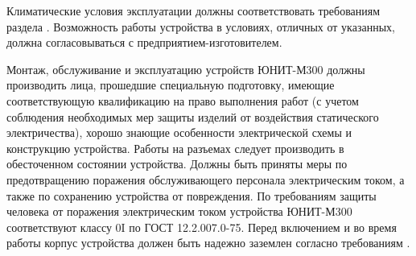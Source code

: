 \color{black}

\color{black}
\nopagebreak
\vspace{3mm}
\par
\sloppy

\par
Климатические  условия  эксплуатации  должны  соответствовать  требованиям  раздела \color{red}{1.2 настоящего  РЭ}\color{black}.  Возможность  работы  устройства  в  условиях,  отличных  от  указанных,  должна согласовываться с предприятием-изготовителем.

{
\color{black}
\nopagebreak
\vspace{3mm}
}

{
\vspace{2mm}
\color{black}
\nopagebreak
\vspace{3mm}
}

\par
Монтаж, обслуживание и эксплуатацию устройств ЮНИТ-М300 должны производить лица, прошедшие специальную  подготовку,  имеющие  соответствующую квалификацию  на  право  выполнения  работ  (с учетом  соблюдения  необходимых  мер  защиты  изделий  от  воздействия  статического  электричества), хорошо знающие особенности электрической схемы и конструкцию устройства. Работы  на  разъемах  следует  производить  в  обесточенном  состоянии  устройства.  Должны  быть приняты меры по предотвращению поражения обслуживающего персонала электрическим током, а также 
по  сохранению  устройства  от  повреждения.  По  требованиям  защиты  человека  от  поражения электрическим током устройства ЮНИТ-М300 соответствуют классу 0I по ГОСТ 12.2.007.0-75. 
Перед включением и во время работы корпус устройства должен быть надежно заземлен согласно требованиям \color{red}{подраздела 3.2.2}\color{black}.

